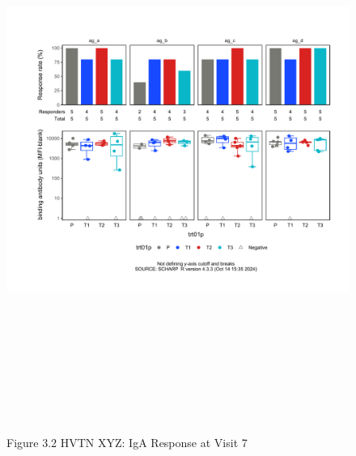 \documentclass[12pt]{article}
\begin{document}
\clearpage\begin{figure}[H]

{\centering \includegraphics[width=8.75in,height=7.25in]{test_cases_files/figure-latex/unnamed-chunk-6-2} 

}

\caption[Figure 3.2 boxplot (pos. response boxplots)]{Figure 3.2 HVTN XYZ: IgA Response at Visit 7}\label{fig:unnamed-chunk-6-2}
\end{figure}
\end{document}
